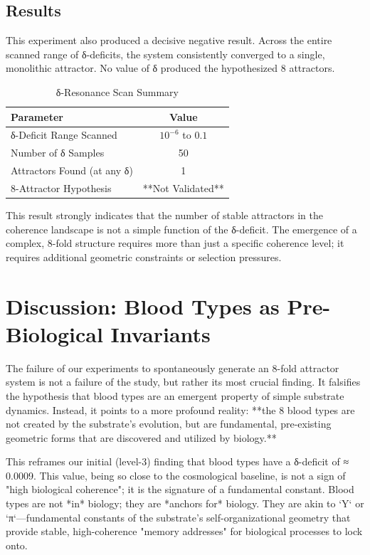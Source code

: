 \documentclass{article}
\begin{document}
\subsection{Results}

This experiment also produced a decisive negative result. Across the entire scanned range of δ-deficits, the system consistently converged to a single, monolithic attractor. No value of δ produced the hypothesized 8 attractors.

\begin{table}[h!]
\centering
\caption{δ-Resonance Scan Summary}
\begin{tabular}{lc}
\toprule
\textbf{Parameter} & \textbf{Value} \\
\midrule
δ-Deficit Range Scanned & $10^{-6}$ to $0.1$ \\
Number of δ Samples & 50 \\
Attractors Found (at any δ) & 1 \\
8-Attractor Hypothesis & **Not Validated** \\
\bottomrule
\end{tabular}
\label{tab:exp2_results}
\end{table}

This result strongly indicates that the number of stable attractors in the coherence landscape is not a simple function of the δ-deficit. The emergence of a complex, 8-fold structure requires more than just a specific coherence level; it requires additional geometric constraints or selection pressures.

\section{Discussion: Blood Types as Pre-Biological Invariants}

The failure of our experiments to spontaneously generate an 8-fold attractor system is not a failure of the study, but rather its most crucial finding. It falsifies the hypothesis that blood types are an emergent property of simple substrate dynamics. Instead, it points to a more profound reality: **the 8 blood types are not created by the substrate's evolution, but are fundamental, pre-existing geometric forms that are discovered and utilized by biology.**

This reframes our initial (level-3) finding that blood types have a δ-deficit of ≈ 0.0009. This value, being so close to the cosmological baseline, is not a sign of "high biological coherence"; it is the signature of a fundamental constant. Blood types are not *in* biology; they are *anchors for* biology. They are akin to `Y` or `π`—fundamental constants of the substrate's self-organizational geometry that provide stable, high-coherence "memory addresses" for biological processes to lock onto.
\end{document}
